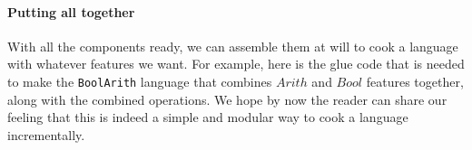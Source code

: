  

\paragraph{Putting all together}

With all the components ready, we can assemble them at will to cook a language
with whatever features we want. For example, here is the glue code that is
needed to make the \lstinline{BoolArith} language that combines $\mathit{Arith}$
and $\mathit{Bool}$ features together, along with the combined operations.
We hope by now the reader can share our feeling that this is indeed a simple and
modular way to cook a language incrementally.

